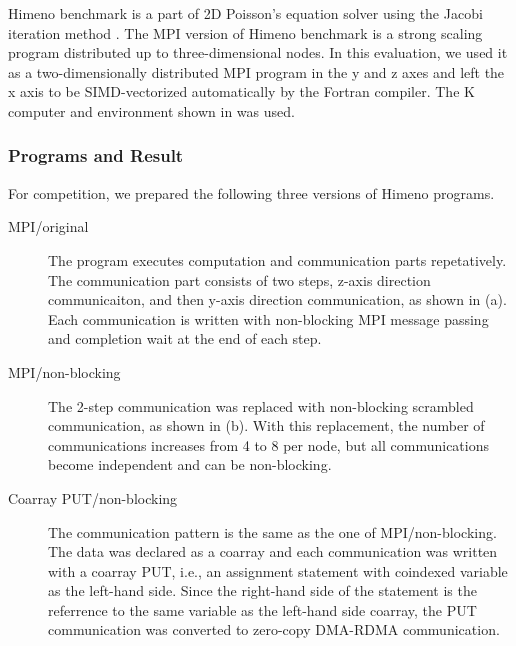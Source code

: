 Himeno benchmark is a part of 2D Poisson's equation solver using the Jacobi 
iteration method \cite{himeno}. 
The MPI version of Himeno benchmark is a strong scaling program distributed 
up to three-dimensional nodes. 
%
In this evaluation, we used it as a two-dimensionally distributed MPI program 
in the y and z axes and left the x axis to be SIMD-vectorized automatically 
by the Fortran compiler.
The K computer and environment shown in  was used.


\subsubsection{Programs and Result}

For competition, we prepared the following three versions of Himeno programs.

\begin{description}
\item [MPI/original]
The program executes computation and communication parts repetatively.
The communication part consists of two steps, z-axis direction communicaiton, 
and then y-axis direction communication, as shown in  (a).
Each communication is written with non-blocking MPI message passing and
completion wait at the end of each step.

\item [MPI/non-blocking]
The 2-step communication was replaced with non-blocking scrambled communication,
as shown in  (b).
With this replacement, the number of communications increases from 4 to 8 
per node, but all communications become independent and can be non-blocking.

\item [Coarray PUT/non-blocking]
The communication pattern is the same as the one of MPI/non-blocking.
The data was declared as a coarray and each communication was written with
a coarray PUT, i.e., an assignment statement with coindexed variable as 
the left-hand side. Since the right-hand side of the statement is the referrence
to the same variable as the left-hand side coarray, the PUT communication
was converted to zero-copy DMA-RDMA communication.

\end{description}

